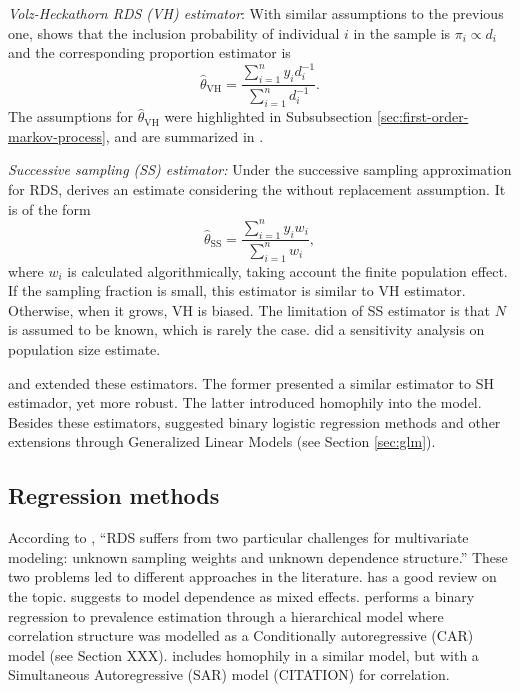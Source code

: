 \begin{alineas}
  \item {\em Volz-Heckathorn RDS (VH) estimator}: With similar assumptions to the
  previous one, \textcite[p. 85]{volz2008probability} shows that the inclusion
   probability of individual $i$ in the sample is $\pi_i \propto
  d_i$ and the corresponding proportion estimator is  
  \begin{equation}
    \hat{\theta}_{\mathrm{VH}} = \frac{\sum_{i=1}^n y_i d_i^{-1}}{\sum_{i=1}^n d_i^{-1}}.
  \end{equation}
  The assumptions for $\hat{\theta}_{\mathrm{VH}}$ were highlighted in Subsubsection
  \ref{sec:first-order-markov-process}, and are summarized in \cite[Table
  1][p. 71]{gile2018methods}. 
  
  \item {\em Successive sampling (SS) estimator:} Under the successive sampling
  approximation for RDS, \textcite[p. 137-138]{gile2011improved} derives an
  estimate considering the without replacement assumption. It is of the form 
  \begin{equation}
    \label{eq:successive-sampling-estimator}
    \hat{\theta}_{\mathrm{SS}} = \frac{\sum_{i=1}^n y_i w_i}{\sum_{i=1}^n w_i}, 
  \end{equation}
  where $w_i$ is calculated algorithmically, taking account the finite
  population effect. If the sampling fraction is small, this estimator is
  similar to VH estimator. Otherwise, when it grows, VH is biased. The
  limitation of SS estimator is that $N$ is assumed to be known, which is
  rarely the case. \textcite[p. 140]{gile2011improved} did a sensitivity
  analysis on population size estimate. 
\end{alineas}

\textcite{ott2019reduced} and \textcite{fellows2019respondent} extended these
estimators. The former presented
a similar estimator to SH estimador, yet more robust. The latter introduced
homophily into the model. Besides these estimators,
\textcite{avery2021statistical} suggested binary logistic
regression methods and other extensions through Generalized Linear Models (see
Section \ref{sec:glm}). 

\subsection{Regression methods}

According to \textcite{gile2011improved}, ``RDS suffers from two particular challenges for multivariate modeling: unknown sampling weights
and unknown dependence structure.'' These two problems led to different
approaches in the literature. \textcite[p.
13-15]{avery2021statistical} has a good review on the
topic. \textcite{spiller2009regression} suggests to model dependence as mixed
effects. \textcite{bastos2012binary} performs a binary regression to
prevalence estimation through a hierarchical model where correlation structure
was modelled as a Conditionally autoregressive (CAR) model (see Section XXX).
\textcite{yauck2021general} includes homophily in a similar model, but with a
Simultaneous Autoregressive (SAR) model (CITATION) for correlation. 

